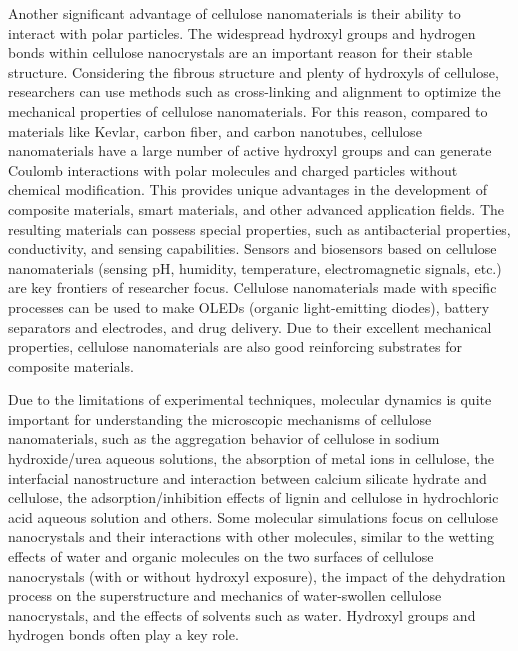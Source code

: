 \documentclass{article}
\begin{document}
Another significant advantage of cellulose nanomaterials is their ability to interact with polar particles.
The widespread hydroxyl groups and hydrogen bonds within cellulose nanocrystals are an important reason for their stable structure\cite{wohlert2022cellulose}.
Considering the fibrous structure and plenty of hydroxyls of cellulose, researchers can use methods such as cross-linking\cite{tu2021superior} and alignment\cite{chen2020electric,li2021ionic} to optimize the mechanical properties of cellulose nanomaterials\cite{zhang2019non,ray2021mechanics}.
For this reason, compared to materials like Kevlar, carbon fiber, and carbon nanotubes, cellulose nanomaterials have a large number of active hydroxyl groups and can generate Coulomb interactions with polar molecules and charged particles without chemical modification.
This provides unique advantages in the development of composite materials, smart materials, and other advanced application fields\cite{kim2015review}.
The resulting materials can possess special properties, such as antibacterial properties, conductivity, and sensing capabilities\cite{xu2020novel,chen2020ultrastretchable,zhu2021highly,jiao2021highly}.
Sensors and biosensors based on cellulose nanomaterials (sensing pH\cite{wang2022active,saidi2017poly}, humidity\cite{wang2020flexible}, temperature\cite{yin2020flexible,kim2006discovery}, electromagnetic signals\cite{xie2020flexible,jeon2010bacterial,vitta2010magnetically,jiao2021highly}, etc.) are key frontiers of researcher focus\cite{hamidon2022cellulose}.
Cellulose nanomaterials made with specific processes can be used to make OLEDs (organic light-emitting diodes)\cite{okahisa2009optically}, battery separators and electrodes\cite{chen2018nanocellulose,wang2017cellulose}, and drug delivery\cite{zhang2011thermo}.
Due to their excellent mechanical properties, cellulose nanomaterials are also good reinforcing substrates for composite materials\cite{shojaeiarani2021cellulose,xie2022hydroxyl,zhang2020thermally,qua2009preparation}.

Due to the limitations of experimental techniques, molecular dynamics is quite important for understanding the microscopic mechanisms of cellulose nanomaterials,
such as the aggregation behavior of cellulose in sodium hydroxide/urea aqueous solutions\cite{liu2020molecular}, the absorption of metal ions in cellulose\cite{reis2020dft}, the interfacial nanostructure and interaction between calcium silicate hydrate and cellulose\cite{liu2020analysis},
the adsorption/inhibition effects of lignin and cellulose in hydrochloric acid aqueous solution\cite{shahmoradi2020studying} and others\cite{du2021molecular,shao2020study,mudedla2021effect,zhu2020evaluation}.
Some molecular simulations focus on cellulose nanocrystals and their interactions with other molecules, similar to the wetting effects of water and organic molecules on the two surfaces of cellulose nanocrystals (with or without hydroxyl exposure)\cite{malaspina2019molecular},
the impact of the dehydration process on the superstructure and mechanics of water-swollen cellulose nanocrystals\cite{ogawa2020drying}, and the effects of solvents such as water\cite{miyamoto2015molecular,matthews2006computer,maurer2013molecular}.
Hydroxyl groups and hydrogen bonds often play a key role.
\end{document}
